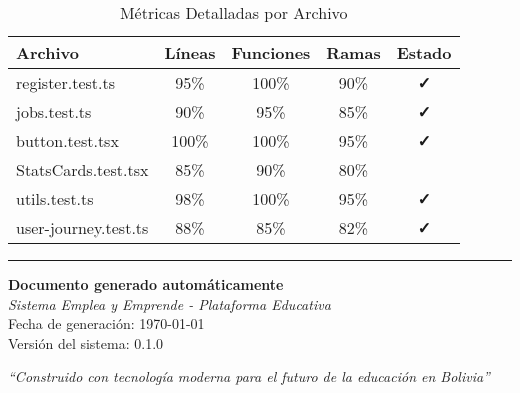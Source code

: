 \documentclass[12pt,a4paper]{article}
\begin{document}
\begin{table}[H]
\centering
\caption{Métricas Detalladas por Archivo}
\begin{tabular}{@{}lcccc@{}}
\toprule
\textbf{Archivo} & \textbf{Líneas} & \textbf{Funciones} & \textbf{Ramas} & \textbf{Estado} \\
\midrule
register.test.ts & 95\% & 100\% & 90\% & \textcolor{successgreen}{\textbf{✓}} \\
jobs.test.ts & 90\% & 95\% & 85\% & \textcolor{successgreen}{\textbf{✓}} \\
button.test.tsx & 100\% & 100\% & 95\% & \textcolor{successgreen}{\textbf{✓}} \\
StatsCards.test.tsx & 85\% & 90\% & 80\% & \textcolor{warningyellow}{\textbf{~}} \\
utils.test.ts & 98\% & 100\% & 95\% & \textcolor{successgreen}{\textbf{✓}} \\
user-journey.test.ts & 88\% & 85\% & 82\% & \textcolor{successgreen}{\textbf{✓}} \\
\bottomrule
\end{tabular}
\end{table}


\vspace{2cm}

\noindent\rule{\textwidth}{0.4pt}

\vspace{0.5cm}

\begin{center}
\textbf{Documento generado automáticamente}\\
\textit{Sistema Emplea y Emprende - Plataforma Educativa}\\
Fecha de generación: \today\\
Versión del sistema: 0.1.0\\

\vspace{1cm}

\textit{``Construido con tecnología moderna para el futuro de la educación en Bolivia''}
\end{center}
\end{document}
